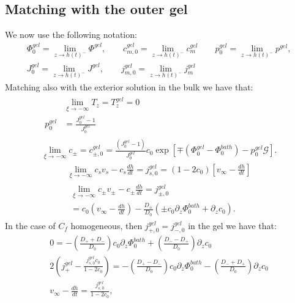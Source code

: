 \documentclass[12pt]{extarticle}
\begin{document}
\subsection{Matching with the outer gel}
We now use the following notation:
\begin{equation}
\begin{aligned}
\Phi^{gel}_0=\lim_{z\rightarrow h(t)^-} \Phi^{gel}, \qquad c^{gel}_{m,0}=\lim_{z\rightarrow h(t)^-} c^{gel}_{m} \qquad p_0^{gel}=\lim_{z\rightarrow h(t)^-} p^{gel},\\
J^{gel}_0=\lim_{z\rightarrow h(t)^-} J^{gel}, \qquad j^{gel}_{m,0}=\lim_{z\rightarrow h(t)^-} j^{gel}_m
\end{aligned}
\end{equation}
Matching also with the exterior solution in the bulk we have that:
\begin{gather}
\begin{aligned}
&\lim_{\xi\rightarrow -\infty} T_z = T^{gel}_z =0 \\
p^{gel}_0& = \frac{J^{gel}_0-1}{J^{gel}_0}\label{eq1}
\end{aligned}\\
\lim_{\xi\rightarrow -\infty} c_\pm = c^{gel}_{\pm,0} = \frac{(J^{gel}_0-1)}{J^{gel}_0}c_0\exp[\mp(\Phi^{gel}_0-\Phi_0^{bath})-p_0^{gel}\mathcal{G}].
\end{gather}
\begin{gather}
\lim_{\xi\rightarrow -\infty} c_s v_s - c_s \frac{dh}{dt}= j^{gel}_{s,0} =(1-2c_0)\left[v_\infty-\frac{dh}{dt}\right]\\
\begin{aligned}
\lim_{\xi\rightarrow -\infty}c_\pm v_\pm - c_\pm \frac{dh}{dt}=j^{gel}_{\pm,0}\\
=c_0\left(v_\infty-\frac{dh}{dt}\right)-\frac{D_\pm}{D_0}\left(\pm c_0 \partial_z \Phi^{bath}_0+\partial_z c_0\right).
\end{aligned}
\end{gather}
In the case of $C_f$ homogeneous, then $j^{gel}_{+,0}=j^{gel}_{-,0}$ in the gel we have that:
\begin{eqnarray}
0= - \left(\frac{D_++D_-}{D_0}\right)c_0\partial_z \Phi^{bath}_0 + \left(\frac{D_--D_+}{D_0}\right)\partial_z c_0\label{A}\\
2\left(j^{gel}_+-\frac{j_{s,0}^{gel}c_0}{1-2c_0}\right) =- \left(\frac{D_+-D_-}{D_0}\right)c_0\partial_z \Phi^{bath}_0 - \left(\frac{D_-+D_+}{D_0}\right)\partial_z c_0\label{B}\\
v_\infty-\frac{d h}{dt} = \frac{j_{s,0}^{gel}}{1-2c_0},
\end{eqnarray}
\end{document}
